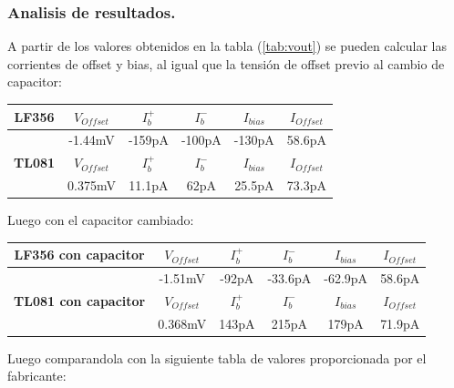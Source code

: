 \subsubsection{Analisis de resultados.}
A partir de los valores obtenidos en la tabla  (\ref{tab:vout}) se pueden calcular las corrientes de offset y bias, al igual que la tensión de offset previo al cambio de capacitor:
\begin{table}[H]
\begin{center}
\begin{tabular}{|c|c|c|c|c|c|}
\hline
\textbf{LF356} & \textbf{$V_{Offset}$} & \textbf{$I_b^+$} & \textbf{$I_b^-$} & \textbf{$I_{bias}$} & \textbf{$I_{Offset}$} \\ \hline
               & -1.44mV                & -159pA           & -100pA           & -130pA               & 58.6pA                 \\ \hline
\textbf{TL081} & \textbf{$V_{Offset}$} & \textbf{$I_b^+$} & \textbf{$I_b^-$} & \textbf{$I_{bias}$} & \textbf{$I_{Offset}$} \\ \hline
\textbf{}      & 0.375mV                & 11.1pA           & 62pA             & 25.5pA               & 73.3pA                 \\ \hline
\end{tabular}
\end{center}
\end{table}
Luego con el capacitor cambiado:
\begin{table}[H]
\begin{center}
\begin{tabular}{|c|c|c|c|c|c|}
\hline
\textbf{LF356 con capacitor} & \textbf{$V_{Offset}$} & \textbf{$I_b^+$} & \textbf{$I_b^-$} & \textbf{$I_{bias}$} & \textbf{$I_{Offset}$} \\ \hline
               & -1.51mV                & -92pA           & -33.6pA           & -62.9pA               & 58.6pA                 \\ \hline
\textbf{TL081 con capacitor} & \textbf{$V_{Offset}$} & \textbf{$I_b^+$} & \textbf{$I_b^-$} & \textbf{$I_{bias}$} & \textbf{$I_{Offset}$} \\ \hline
\textbf{}      & 0.368mV                & 143pA           & 215pA             & 179pA               & 71.9pA                 \\ \hline
\end{tabular}
\end{center}
\end{table}
Luego comparandola con la siguiente tabla de valores proporcionada por el fabricante:
